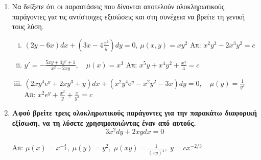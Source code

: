 \begin{enumerate}
  \item Να δείξετε ότι οι παραστάσεις που δίνονται αποτελούν ολοκληρωτικούς παράγοντες 
    για τις αντίστοιχες εξισώσεις και στη συνέχεια να βρείτε τη γενική τους λύση.
    \begin{enumerate}[i)]
      \item $ (2y-6x)dx+\left(3x-4\frac{x^{2}}{y}\right)dy=0 $, \; $ \mu (x,y) = xy^{2} $
        \hfill Απ: $ x^{2}y^{3}-2x^{3}y^{2}=c $ %
      \item $ y' =- \frac{5xy+4y^{2}+1}{x^{2}+2xy}, \quad \mu(x)=x^{3} $  
        \hfill Απ: $ x^{5}y+x^{4}y^{2} + \frac{x^{4}}{4} = c $ 
      \item $ (2xy^{4} \mathrm{e}^{y} + 2xy^{3}+y)dx + (x^{2}y^{4}\mathrm{e}^{y} -
        x^{2}y^{2}-3x)dy=0, \quad \mu (y) = \frac{1}{y^{4}} $ 
        \hfill Απ: $ x^{2}e^{y}+ \frac{x^{2}}{y} + \frac{x}{y^{3}} =c $ 
    \end{enumerate}

  \item {\bfseries Αφού βρείτε τρεις ολοκληρωτικούς παράγοντες για την 
    παρακάτω διαφορική εξίσωση, να τη λύσετε χρησιμοποιώντας έναν από αυτούς.}
    \[
      3x^{2}dy+2xydx=0 
    \] 

    \hfill Απ:  $ \mu (x) = x^{-\frac{4}{3}}, \; \mu (y) = y^{2}, \; \mu (xy) =
    \frac{1}{(xy)^{4}}, \; y=cx^{-2/3} $
      \end{enumerate}

        
